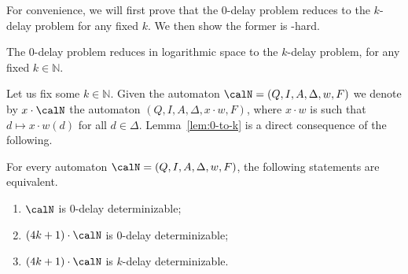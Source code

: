 \documentclass[a4paper]{article}
\begin{document}
For convenience, we will first prove that the $0$-delay problem reduces to the
$k$-delay problem for any fixed $k$. We then show the former is \EXP-hard.
\begin{lemma}\label{lem:0-to-k}
	The $0$-delay problem reduces in logarithmic space to the $k$-delay
	problem, for any fixed $k \in \mathbb{N}$.
\end{lemma}

Let us fix some $k \in \mathbb{N}$. Given the automaton $\calN =
(Q,I,A,\Delta,w,F)$ we denote by $x \cdot \calN$ the automaton $(Q,I,A,\Delta,x
\cdot w,F)$, where $x \cdot w$ is such that $d \mapsto x \cdot w(d)$ for all $d
\in \Delta$. Lemma~\ref{lem:0-to-k} is a direct consequence of the following.
\begin{lemma}
	For every automaton $\calN = (Q,I,A,\Delta,w,F)$, the following statements are equivalent.
	\begin{enumerate}
	\item \label{N1}
	$\calN$ is $0$-delay determinizable;
	\item \label{N2}
	$(4k + 1) \cdot \calN$ is $0$-delay determinizable;
	\item \label{N3}
	$(4k + 1) \cdot \calN$ is $k$-delay determinizable.
	\end{enumerate}
\end{lemma}
\end{document}
